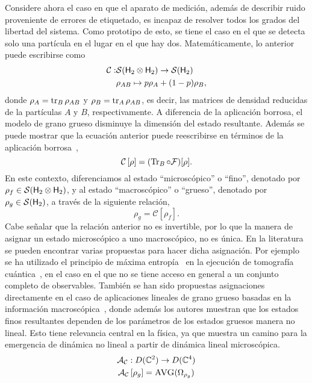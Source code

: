 \documentclass[onecolumn,10pt]{article}
\newcommand{\mcS}{\mathcal{S}}
\newcommand{\hilbert}{{\sf H}}
\newcommand{\mcF}{\mathcal{F}}
\newcommand{\mcC}{\mathcal{C}}
\newcommand{\mcA}{\mathcal{A}}
\newcommand{\Complex}{\mathbb{C}} %
\newcommand{\CG}[1]{\mcC\left[#1\right]}
\begin{document}
Considere ahora el caso en que el aparato de medición, además de describir ruido proveniente de errores de etiquetado, es incapaz de resolver todos los grados del libertad del sistema. Como prototipo de esto, se tiene el caso en el que se detecta solo una partícula en el lugar en el que hay dos. Matemáticamente, lo anterior puede escribirse como
\begin{align}
\mcC:&\mcS(\hilbert_2 \otimes \hilbert_2)\to \mcS(\hilbert_2)\nonumber\\
 &\rho_{AB} \mapsto p\rho_A+(1-p)\rho_B,
\label{eq:CG}
\end{align}
donde $\rho_A=\tr_B \rho_{AB}$ y $\rho_B=\tr_A \rho_{AB}$, es decir, las matrices de densidad reducidas de la partículas $A$ y $B$, respectivamente.
%
%
A diferencia de la aplicación borrosa, el modelo de grano grueso disminuye la dimensión del estado resultante. Además se puede mostrar que la ecuación anterior puede reescribirse en términos de la aplicación borrosa~\cite{FuzzyMeasurements},
\begin{equation}
\CG{\rho}=(\Tr_{B}\circ\mcF)[\rho].
\end{equation}
En este contexto, diferenciamos al estado ``microscópico'' o ``fino'', denotado por $\rho_{f}\in \mcS(\hilbert_2\otimes\hilbert_2)$, y al estado ``macroscópico'' o ``grueso'', denotado por $\rho_{g}\in \mcS(\hilbert_2)$, a través de la siguiente relación,
\begin{equation}
    \rho_{g}=\CG{\rho_{f}}.
\end{equation}
Cabe señalar que la relación anterior no es invertible, por lo que la manera de asignar un estado microscópico a uno macroscópico, no es única. En la literatura se pueden encontrar varias propuestas para hacer dicha asignación. Por ejemplo se ha utilizado el principio de máxima entropía~\cite{jaynes} en la ejecución de tomografía cuántica~\cite{maxent}, en el caso en el que no se tiene acceso en general a un conjunto completo de observables. También se han sido propuestas asignaciones directamente en el caso de aplicaciones lineales de grano grueso basadas en la información macroscópica~\cite{Macro-To-Micro}, donde además los autores muestran que los estados finos resultantes dependen de los parámetros de los estados gruesos manera no lineal. Esto tiene relevancia central en la física, ya que muestra un camino para la emergencia de dinámica no lineal a partir de dinámica lineal microscópica.
\begin{gather}
\mcA_{\mcC}:D(\Complex^{2})\rightarrow D(\Complex^{4})\label{eq:AAMDom}\\
\mcA_{\mcC}\left[\rho_{g}\right]=\textsc{AVG}(\Omega_{\rho_{g}})\label{eq:AAM}
\end{gather}
\end{document}
